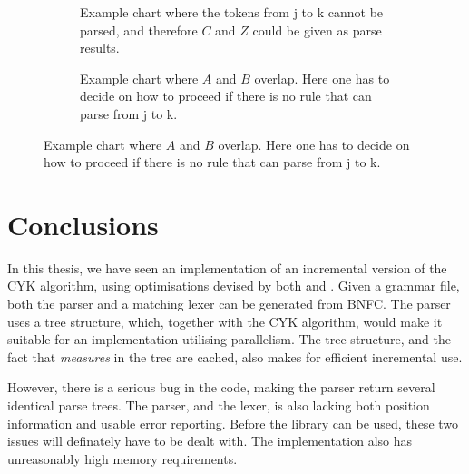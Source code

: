 \documentclass[a4paper,12pt,notitlepage]{report}
\newcommand{\subt}[3] { 
  \draw[grid] (#1,#1) -- (#1,#2) node[inChart] {#3} -- (#2,#2);
  \fill[color=black] (#1,#2) circle (2pt)
 }
\newcommand{\mrk}[2]{\node[inChart] at (#1,#1) {#2}}
\begin{document}
\begin{figure}[H]
  \centering
  \begin{subfigure}[H]{.4\textwidth}
    \flushleft
     \caption{\label{missingglue} \small Example chart where the tokens from j to k
     cannot be parsed, and therefore $C$ and $Z$ could be given as parse
     results.}
  \end{subfigure}
  \begin{subfigure}[H]{.1\textwidth}
  \text{}
  \end{subfigure}
  \begin{subfigure}[H]{.4\textwidth}
    \flushright
    \caption{\label{parseoverlap} \small Example chart where $A$ and $B$ overlap. Here one
    has to decide on how to proceed if there is no rule that can parse from j to
    k.}
  \end{subfigure}
\end{figure}

\section{Conclusions}
In this thesis, we have seen an implementation of an incremental version of the
CYK algorithm, using optimisations devised by both \citeauthor{Valiant75} and
\citeauthor{parparsepaper}. Given a grammar file, both the parser and a matching
lexer can be generated from BNFC. The parser uses a tree structure, which,
together with the CYK algorithm, would make it suitable for an implementation
utilising parallelism. The tree structure, and the fact that \textit{measures}
in the tree are cached, also makes for efficient incremental use.

However, there is a serious bug in the code, making the parser return several
identical parse trees. The parser, and the lexer, is also lacking both position
information and usable error reporting. Before the library can be used, these
two issues will definately have to be dealt with. The implementation also has
unreasonably high memory requirements.
\end{document}

